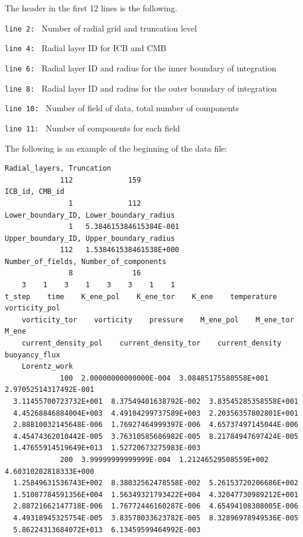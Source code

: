 The header in the first 12 lines is the following. 
%
\begin{description}
\item{\tt  line 2: } Number of radial grid and truncation level
\item{\tt  line 4: } Radial layer ID for ICB and CMB
\item{\tt  line 6: } Radial layer ID and radius for the inner boundary of integration
\item{\tt  line 8: } Radial layer ID and radius for the outer boundary of integration
\item{\tt  line 10: } Number of field of data, total number of components
\item{\tt  line 11: } Number of components for each field
\end{description}
%
The following is an example of the beginning of the data file:
{\scriptsize
\begin{verbatim}
Radial_layers, Truncation
             112             159
ICB_id, CMB_id
               1             112
Lower_boundary_ID, Lower_boundary_radius
               1   5.384615384615384E-001
Upper_boundary_ID, Upper_boundary_radius
             112   1.538461538461538E+000
Number_of_fields, Number_of_components
               8              16
    3    1    3    1    3    3    1    1
t_step    time    K_ene_pol    K_ene_tor    K_ene    temperature    vorticity_pol
    vorticity_tor    vorticity    pressure    M_ene_pol    M_ene_tor    M_ene
    current_density_pol    current_density_tor    current_density    buoyancy_flux    
    Lorentz_work    
             100  2.00000000000000E-004  3.08485175580558E+001  2.97052514317492E-001
  3.11455700723732E+001  8.37549401638792E-002  3.83545285358558E+001  
  4.45268846884004E+003  4.49104299737589E+003  2.20356357802801E+001  
  2.88810032145648E-006  1.76927464999397E-006  4.65737497145044E-006  
  4.45474362010442E-005  3.76310585686982E-005  8.21784947697424E-005  
  1.47655914519649E+013  1.52720673275983E-003
             200  3.99999999999999E-004  1.21246529508559E+002  4.60310202818333E+000  
  1.25849631536743E+002  8.38032562478558E-002  5.26153720206686E+002  
  1.51087784591356E+004  1.56349321793422E+004  4.32047730989212E+001  
  2.88721662147718E-006  1.76772446160287E-006  4.65494108308005E-006  
  4.49318945325754E-005  3.83578033623782E-005  8.32896978949536E-005  
  5.86224313684072E+013  6.13459599464992E-003
\end{verbatim}
}
%
